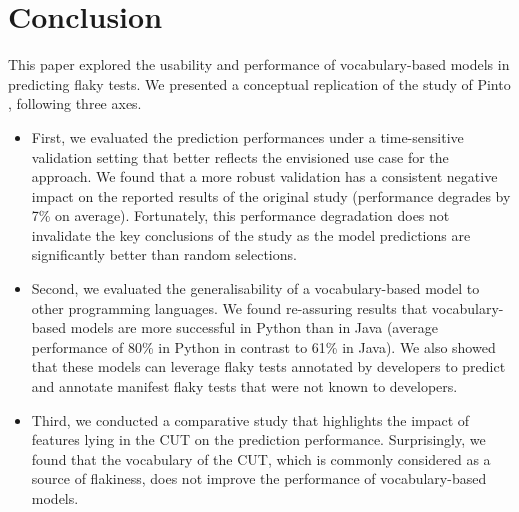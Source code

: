 \section{Conclusion}
\label{sec:replication-conclusion}


This paper explored the usability and performance of vocabulary-based models in predicting flaky tests. 
We presented a conceptual replication of the study of Pinto \etal, following three axes. 
\begin{itemize}
    \item First, we evaluated the prediction performances under a time-sensitive validation setting that better reflects the envisioned use case for the approach.
We found that a more robust validation has a consistent negative impact on the reported results of the original study (performance degrades by 7\% on average).
Fortunately, this performance degradation does not invalidate the key conclusions of the study as the model predictions are significantly better than random selections. 

    \item Second, we evaluated the generalisability of a vocabulary-based model to other programming languages. 
We found re-assuring results that vocabulary-based models are more successful in Python than in Java (average performance of 80\% in Python in contrast to 61\% in Java). We also showed that these models can leverage flaky tests annotated by developers to predict and annotate manifest flaky tests that were not known to developers.

    \item Third, we conducted a comparative study that highlights the impact of features lying in the CUT on the prediction performance.
    Surprisingly, we found that the vocabulary of the CUT, which is commonly considered as a source of flakiness, does not improve the performance of vocabulary-based models. 
\end{itemize}

